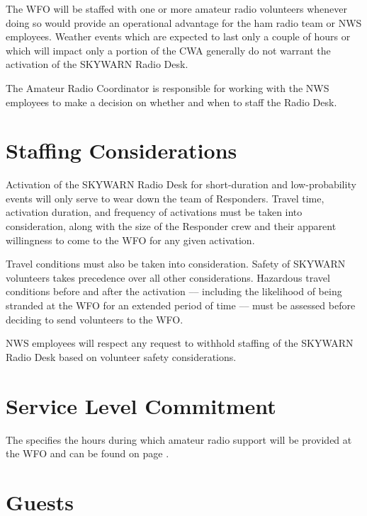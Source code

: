 \documentclass[pdflatex,letterpaper,twoside,12pt]{book}
\begin{document}
The WFO will be staffed with one or more amateur radio volunteers whenever doing so would provide an operational advantage for the ham radio team or NWS employees.  Weather events which are expected to last only a couple of hours or which will impact only a portion of the CWA generally do not warrant the activation of the SKYWARN Radio Desk.

The Amateur Radio Coordinator is responsible for working with the NWS employees to make a decision on whether and when to staff the Radio Desk.


\section{Staffing Considerations}

Activation of the SKYWARN Radio Desk for short-duration and low-probability events will only serve to wear down the team of Responders.  Travel time, activation duration, and frequency of activations must be taken into consideration, along with the size of the Responder crew and their apparent willingness to come to the WFO for any given activation.

Travel conditions must also be taken into consideration.  Safety of SKYWARN volunteers takes precedence over all other considerations.  Hazardous travel conditions before and after the activation –-- including the likelihood of being stranded at the WFO for an extended period of time –-- must be assessed before deciding to send volunteers to the WFO.

NWS employees will respect any request to withhold staffing of the SKYWARN Radio Desk based on volunteer safety considerations.


\section{Service Level Commitment}

The  specifies the hours during which amateur radio support will be provided at the WFO and can be found on page \pageref{wx4akq-criteria}.


\section{Guests}
\end{document}
